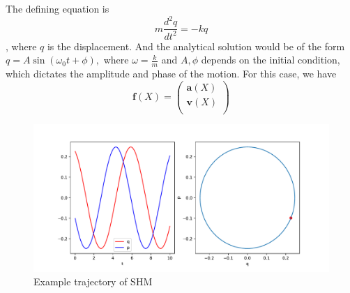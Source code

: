\documentclass{statsmsc}
\begin{document}
The defining equation is $$m\frac{d^2q}{dt^2}=-kq$$, where $q$ is the displacement.
And the analytical solution would be of the form $q=A\sin(\omega_0t+\phi),$ where $\omega=\frac{k}{m}$ and $A, \phi$ depends on the initial condition, which dictates the amplitude and phase of the motion. 
For this case, we have 
$$
\mathbf{f}(X)=\begin{pmatrix}
    \mathbf{a}(X)\\
    \mathbf{v}(X)\\
\end{pmatrix}
$$

\begin{figure}[H] 
  \includegraphics[width=0.6\linewidth]{../codes/figures/shm_trajectory_1D.pdf}
  \centering
  \caption{Example trajectory of SHM}
  \label{fig:shm_trajectory}
\end{figure}
\end{document}
